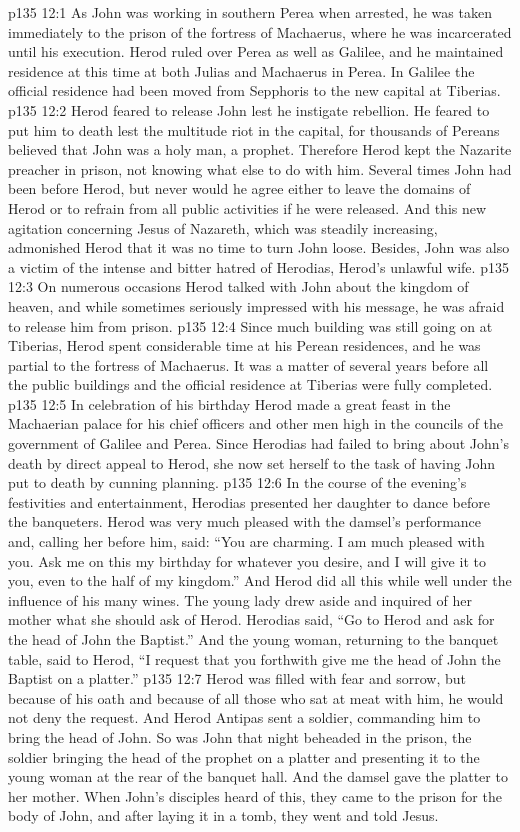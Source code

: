 \vs p135 12:1 As John was working in southern Perea when arrested, he was taken immediately to the prison of the fortress of Machaerus, where he was incarcerated until his execution. Herod ruled over Perea as well as Galilee, and he maintained residence at this time at both Julias and Machaerus in Perea. In Galilee the official residence had been moved from Sepphoris to the new capital at Tiberias.
\vs p135 12:2 Herod feared to release John lest he instigate rebellion. He feared to put him to death lest the multitude riot in the capital, for thousands of Pereans believed that John was a holy man, a prophet. Therefore Herod kept the Nazarite preacher in prison, not knowing what else to do with him. Several times John had been before Herod, but never would he agree either to leave the domains of Herod or to refrain from all public activities if he were released. And this new agitation concerning Jesus of Nazareth, which was steadily increasing, admonished Herod that it was no time to turn John loose. Besides, John was also a victim of the intense and bitter hatred of Herodias, Herod’s unlawful wife.
\vs p135 12:3 On numerous occasions Herod talked with John about the kingdom of heaven, and while sometimes seriously impressed with his message, he was afraid to release him from prison.
\vs p135 12:4 Since much building was still going on at Tiberias, Herod spent considerable time at his Perean residences, and he was partial to the fortress of Machaerus. It was a matter of several years before all the public buildings and the official residence at Tiberias were fully completed.
\vs p135 12:5 \pc In celebration of his birthday Herod made a great feast in the Machaerian palace for his chief officers and other men high in the councils of the government of Galilee and Perea. Since Herodias had failed to bring about John’s death by direct appeal to Herod, she now set herself to the task of having John put to death by cunning planning.
\vs p135 12:6 In the course of the evening’s festivities and entertainment, Herodias presented her daughter to dance before the banqueters. Herod was very much pleased with the damsel’s performance and, calling her before him, said: “You are charming. I am much pleased with you. Ask me on this my birthday for whatever you desire, and I will give it to you, even to the half of my kingdom.” And Herod did all this while well under the influence of his many wines. The young lady drew aside and inquired of her mother what she should ask of Herod. Herodias said, “Go to Herod and ask for the head of John the Baptist.” And the young woman, returning to the banquet table, said to Herod, “I request that you forthwith give me the head of John the Baptist on a platter.”
\vs p135 12:7 Herod was filled with fear and sorrow, but because of his oath and because of all those who sat at meat with him, he would not deny the request. And Herod Antipas sent a soldier, commanding him to bring the head of John. So was John that night beheaded in the prison, the soldier bringing the head of the prophet on a platter and presenting it to the young woman at the rear of the banquet hall. And the damsel gave the platter to her mother. When John’s disciples heard of this, they came to the prison for the body of John, and after laying it in a tomb, they went and told Jesus.
\quizlink
